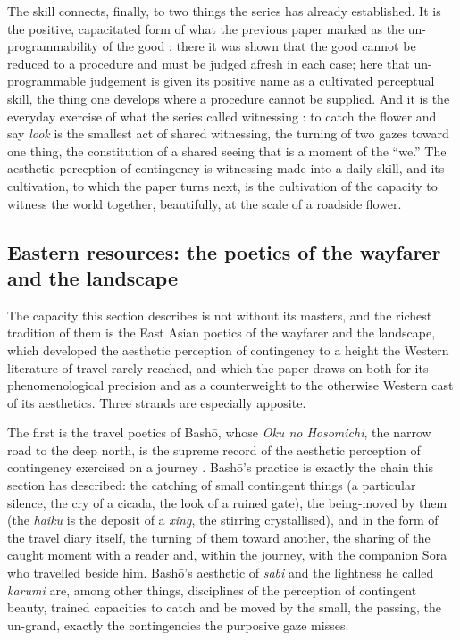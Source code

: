 The skill connects, finally, to two things the series has already established. It is the positive, capacitated form of what the previous paper marked as the un-programmability of the good \parencite{paperxx}: there it was shown that the good cannot be reduced to a procedure and must be judged afresh in each case; here that un-programmable judgement is given its positive name as a cultivated perceptual skill, the thing one develops where a procedure cannot be supplied. And it is the everyday exercise of what the series called witnessing \parencite{paperxix}: to catch the flower and say \emph{look} is the smallest act of shared witnessing, the turning of two gazes toward one thing, the constitution of a shared seeing that is a moment of the ``we.'' The aesthetic perception of contingency is witnessing made into a daily skill, and its cultivation, to which the paper turns next, is the cultivation of the capacity to witness the world together, beautifully, at the scale of a roadside flower.

\subsection{Eastern resources: the poetics of the wayfarer and the landscape}
\label{p21:sub:ap-eastern}

The capacity this section describes is not without its masters, and the richest tradition of them is the East Asian poetics of the wayfarer and the landscape, which developed the aesthetic perception of contingency to a height the Western literature of travel rarely reached, and which the paper draws on both for its phenomenological precision and as a counterweight to the otherwise Western cast of its aesthetics. Three strands are especially apposite.

The first is the travel poetics of Bash\=o, whose \emph{Oku no Hosomichi}, the narrow road to the deep north, is the supreme record of the aesthetic perception of contingency exercised on a journey \parencite{basho1966}. Bash\=o's practice is exactly the chain this section has described: the catching of small contingent things (a particular silence, the cry of a cicada, the look of a ruined gate), the being-moved by them (the \emph{haiku} is the deposit of a \emph{xing}, the stirring crystallised), and in the form of the travel diary itself, the turning of them toward another, the sharing of the caught moment with a reader and, within the journey, with the companion Sora who travelled beside him. Bash\=o's aesthetic of \emph{sabi} and the lightness he called \emph{karumi} are, among other things, disciplines of the perception of contingent beauty, trained capacities to catch and be moved by the small, the passing, the un-grand, exactly the contingencies the purposive gaze misses.

